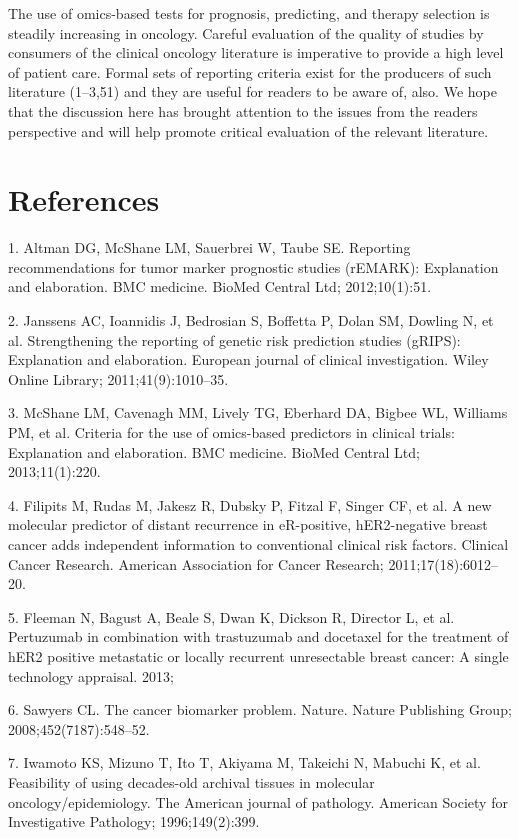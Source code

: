 \documentclass[11pt]{article}
\begin{document}
The use of omics-based tests for prognosis, predicting, and therapy
selection is steadily increasing in oncology. Careful evaluation of the
quality of studies by consumers of the clinical oncology literature is
imperative to provide a high level of patient care. Formal sets of
reporting criteria exist for the producers of such literature (1--3,51)
and they are useful for readers to be aware of, also. We hope that the
discussion here has brought attention to the issues from the readers
perspective and will help promote critical evaluation of the relevant
literature.

\section{References}\label{references}

\setlength{\parindent}{0pt}

1. Altman DG, McShane LM, Sauerbrei W, Taube SE. Reporting
recommendations for tumor marker prognostic studies (rEMARK):
Explanation and elaboration. BMC medicine. BioMed Central Ltd;
2012;10(1):51.

2. Janssens AC, Ioannidis J, Bedrosian S, Boffetta P, Dolan SM, Dowling
N, et al. Strengthening the reporting of genetic risk prediction studies
(gRIPS): Explanation and elaboration. European journal of clinical
investigation. Wiley Online Library; 2011;41(9):1010--35.

3. McShane LM, Cavenagh MM, Lively TG, Eberhard DA, Bigbee WL, Williams
PM, et al. Criteria for the use of omics-based predictors in clinical
trials: Explanation and elaboration. BMC medicine. BioMed Central Ltd;
2013;11(1):220.

4. Filipits M, Rudas M, Jakesz R, Dubsky P, Fitzal F, Singer CF, et al.
A new molecular predictor of distant recurrence in eR-positive,
hER2-negative breast cancer adds independent information to conventional
clinical risk factors. Clinical Cancer Research. American Association
for Cancer Research; 2011;17(18):6012--20.

5. Fleeman N, Bagust A, Beale S, Dwan K, Dickson R, Director L, et al.
Pertuzumab in combination with trastuzumab and docetaxel for the
treatment of hER2 positive metastatic or locally recurrent unresectable
breast cancer: A single technology appraisal. 2013;

6. Sawyers CL. The cancer biomarker problem. Nature. Nature Publishing
Group; 2008;452(7187):548--52.

7. Iwamoto KS, Mizuno T, Ito T, Akiyama M, Takeichi N, Mabuchi K, et al.
Feasibility of using decades-old archival tissues in molecular
oncology/epidemiology. The American journal of pathology. American
Society for Investigative Pathology; 1996;149(2):399.
\end{document}
